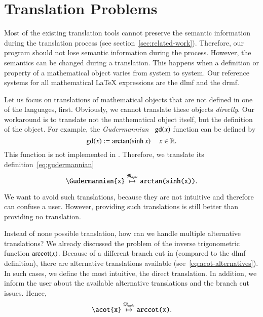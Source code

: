 
\section{Translation Problems}
Most of the existing translation tools cannot preserve the semantic information during the translation process (see section~\ref{sec:related-work}). Therefore, our program should not lose semantic information during the process. However, the semantics can be changed during a translation. This happens when a definition or property of a mathematical object varies from system to system. Our reference systems for all mathematical \LaTeX{} expressions are the \gls{dlmf} and the \gls{drmf}.

Let us focus on translations of mathematical objects that are not defined in one of the languages, first. Obviously, we cannot translate these objects \textit{directly}. Our workaround is to translate not the mathematical object itself, but the definition of the object. For example, the \textit{Gudermannian}~\parencite[(4.23.10)]{NIST:DLMF} $\mathrm{gd}\!\left(x\right)$ function can be defined by
\begin{equation}\label{eq:gudermannian}
\mathrm{gd}\!\left(x\right) := \mathrm{arctan}\!\left(\sinh{x}\right) \quad x \in \mathbb{R}.
\end{equation}
This function is not implemented in \Maple. Therefore, we translate its definition~\eqref{eq:gudermannian}
\begin{equation}\label{eq:guder-trans}
\verb|\Gudermannian{x}| \overset{\langMaple}{\mapsto} \texttt{arctan(sinh(x))}.
\end{equation}

We want to avoid such translations, because they are not intuitive and therefore can confuse a user. However, providing such translations is still better than providing no translation.

Instead of none possible translation, how can we handle multiple alternative translations? We already discussed the problem of the inverse trigonometric function $\mathrm{arccot}\!\left(x\right)$. Because of a different branch cut in \Maple{} (compared to the \gls{dlmf} definition), there are alternative translations available (see~\eqref{eq:acot-alternatives}). In such cases, we define the most intuitive, the direct translation. In addition, we inform the user about the available alternative translations and the branch cut issues. Hence,
\begin{equation}
\verb|\acot{x}| \overset{\langMaple}{\mapsto} \texttt{arccot(x)}.
\end{equation}

